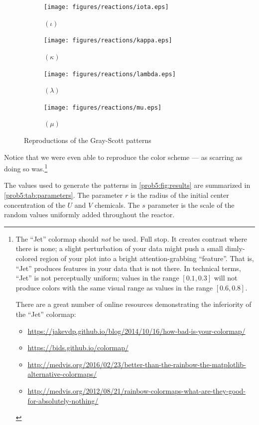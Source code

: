 \begin{figure}[H]
    \begin{subfigure}[t]{0.25\textwidth}
        \centering
        \texttt{[image: figures/reactions/iota.eps]}
        \caption{$(\iota)$}
    \end{subfigure}%
    \begin{subfigure}[t]{0.25\textwidth}
        \centering
        \texttt{[image: figures/reactions/kappa.eps]}
        \caption{$(\kappa)$}
    \end{subfigure}%
    \begin{subfigure}[t]{0.25\textwidth}
        \centering
        \texttt{[image: figures/reactions/lambda.eps]}
        \caption{$(\lambda)$}
    \end{subfigure}%
    \begin{subfigure}[t]{0.25\textwidth}
        \centering
        \texttt{[image: figures/reactions/mu.eps]}
        \caption{$(\mu)$}
    \end{subfigure}%
    \caption{Reproductions of the Gray-Scott patterns}\label{prob5:fig:results}
\end{figure}

Notice that we were even able to reproduce the color scheme --- as scarring as doing so was.\footnote{
    The ``Jet'' colormap should \textit{not} be used.
    Full stop.
    It creates contrast where there is none; a slight perturbation of your data might push a small dimly-colored region of your plot into a bright attention-grabbing ``feature''.
    That is, ``Jet'' produces features in your data that is not there.
    In technical terms, ``Jet'' is not perceptually uniform; values in the range $[0.1, 0.3]$ will not produce colors with the same visual range as values in the range $[0.6, 0.8]$.

    There are a great number of online resources demonstrating the inferiority of the ``Jet'' colormap:
    \begin{itemize}
        \item \url{https://jakevdp.github.io/blog/2014/10/16/how-bad-is-your-colormap/}
        \item \url{https://bids.github.io/colormap/}
        \item \url{http://medvis.org/2016/02/23/better-than-the-rainbow-the-matplotlib-alternative-colormaps/}
        \item \url{http://medvis.org/2012/08/21/rainbow-colormaps-what-are-they-good-for-absolutely-nothing/}
    \end{itemize}
}

The values used to generate the patterns in \autoref{prob5:fig:results} are summarized in \autoref{prob5:tab:parameters}.
The parameter $r$ is the radius of the initial center concentration of the $U$ and $V$ chemicals.
The $s$ parameter is the scale of the random values uniformly added throughout the reactor.

